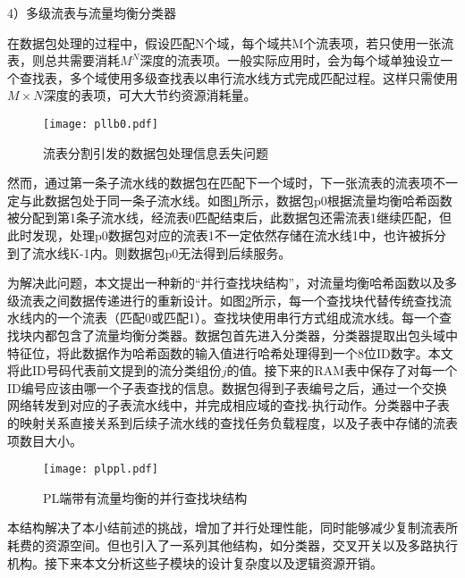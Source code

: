 4）多级流表与流量均衡分类器

在数据包处理的过程中，假设匹配N个域，每个域共M个流表项，若只使用一张流表，则总共需要消耗$ M^N $深度的流表项。一般实际应用时，会为每个域单独设立一个查找表，多个域使用多级查找表以串行流水线方式完成匹配过程。这样只需使用$M\times N$深度的表项，可大大节约资源消耗量。
\begin{figure}[!ht]
	\centering 
	\vspace{-1.5mm} 
	\texttt{[image: pllb0.pdf]}
	\caption{流表分割引发的数据包处理信息丢失问题} \label{fig:pllb0}
\end{figure}

然而，通过第一条子流水线的数据包在匹配下一个域时，下一张流表的流表项不一定与此数据包处于同一条子流水线。如图\ref{fig:pllb0}所示，数据包p0根据流量均衡哈希函数被分配到第1条子流水线，经流表0匹配结束后，此数据包还需流表1继续匹配，但此时发现，处理p0数据包对应的流表1不一定依然存储在流水线1中，也许被拆分到了流水线K-1内。则数据包p0无法得到后续服务。



为解决此问题，本文提出一种新的“并行查找块结构”，对流量均衡哈希函数以及多级流表之间数据传递进行的重新设计。如图\ref{fig:plppl}所示，每一个查找块代替传统查找流水线内的一个流表（匹配0或匹配1）。查找块使用串行方式组成流水线。每一个查找块内都包含了流量均衡分类器。数据包首先进入分类器，分类器提取出包头域中特征位，将此数据作为哈希函数的输入值进行哈希处理得到一个8位ID数字。本文将此ID号码代表前文提到的流分类组份$ j $的值。接下来的RAM表中保存了对每一个ID编号应该由哪一个子表查找的信息。数据包得到子表编号之后，通过一个交换网络转发到对应的子表流水线中，并完成相应域的查找-执行动作。分类器中子表的映射关系直接关系到后续子流水线的查找任务负载程度，以及子表中存储的流表项数目大小。

\begin{figure}[!ht]
	\centering 
	\vspace{-1.5mm} 
	\texttt{[image: plppl.pdf]}
	\caption{PL端带有流量均衡的并行查找块结构} \label{fig:plppl}
\end{figure}

本结构解决了本小结前述的挑战，增加了并行处理性能，同时能够减少复制流表所耗费的资源空间。但也引入了一系列其他结构，如分类器，交叉开关以及多路执行机构。接下来本文分析这些子模块的设计复杂度以及逻辑资源开销。


